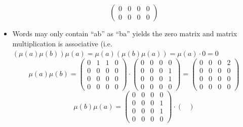 \begin{itemize}
\[\begin{pmatrix}
                                        0 & 0 & 0 & 0 \\
                                        0 & 0 & 0 & 0
                                    \end{pmatrix}  \]
                \item Words may only contain ``ab'' as ``ba'' yields the zero matrix and matrix multiplication is associative (i.e. $(\mu(a)\mu(b))\mu(a) = \mu(a)(\mu(b)\mu(a)) = \mu(a) \cdot 0 = 0$
                    \[  \mu(a)\mu(b) = \begin{pmatrix}
                                        0 & 1 & 1 & 0 \\
                                        0 & 0 & 0 & 0 \\
                                        0 & 0 & 0 & 0 \\
                                        0 & 0 & 0 & 0
                                    \end{pmatrix} \cdot \begin{pmatrix}
                                        0 & 0 & 0 & 0 \\
                                        0 & 0 & 0 & 1 \\
                                        0 & 0 & 0 & 1 \\
                                        0 & 0 & 0 & 0
                                    \end{pmatrix} = \begin{pmatrix}
                                        0 & 0 & 0 & 2 \\
                                        0 & 0 & 0 & 0 \\
                                        0 & 0 & 0 & 0 \\
                                        0 & 0 & 0 & 0
                                    \end{pmatrix}
                                    \]
                    \[ \mu(b)\mu(a) = \begin{pmatrix}
                                        0 & 0 & 0 & 0 \\
                                        0 & 0 & 0 & 1 \\
                                        0 & 0 & 0 & 1 \\
                                        0 & 0 & 0 & 0
                                    \end{pmatrix} \cdot \begin{pmatrix}

\end{pmatrix}\]
\end{itemize}

